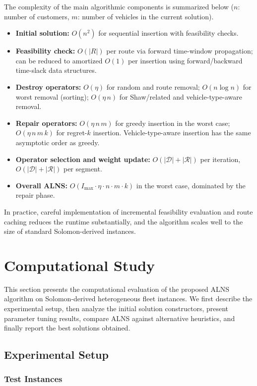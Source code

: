 \documentclass[11pt]{article}
\begin{document}
The complexity of the main algorithmic components is summarized below ($n$: number of customers, $m$: number of vehicles in the current solution).
\begin{itemize}[leftmargin=*]
    \item \textbf{Initial solution:} $O(n^2)$ for sequential insertion with feasibility checks.
    \item \textbf{Feasibility check:} $O(|R|)$ per route via forward time-window propagation; can be reduced to amortized $O(1)$ per insertion using forward/backward time-slack data structures.
    \item \textbf{Destroy operators:} $O(\eta)$ for random and route removal; $O(n \log n)$ for worst removal (sorting); $O(\eta\,n)$ for Shaw/related and vehicle-type-aware removal.
    \item \textbf{Repair operators:} $O(\eta\,n\,m)$ for greedy insertion in the worst case; $O(\eta\,n\,m\,k)$ for regret-$k$ insertion. Vehicle-type-aware insertion has the same asymptotic order as greedy.
    \item \textbf{Operator selection and weight update:} $O(|\mathcal{D}| + |\mathcal{R}|)$ per iteration, $O(|\mathcal{D}| + |\mathcal{R}|)$ per segment.
    \item \textbf{Overall ALNS:} $O(I_{\max} \cdot \eta \cdot n \cdot m \cdot k)$ in the worst case, dominated by the repair phase.
\end{itemize}
In practice, careful implementation of incremental feasibility evaluation and route caching reduces the runtime substantially, and the algorithm scales well to the size of standard Solomon-derived instances.

\section{Computational Study}

This section presents the computational evaluation of the proposed ALNS algorithm on Solomon-derived heterogeneous fleet instances. We first describe the experimental setup, then analyze the initial solution constructors, present parameter tuning results, compare ALNS against alternative heuristics, and finally report the best solutions obtained.

\subsection{Experimental Setup}

\subsubsection{Test Instances}
\end{document}
